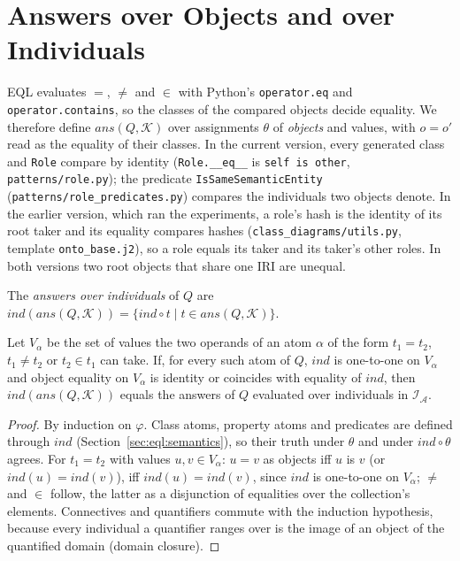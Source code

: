
\section{Answers over Objects and over Individuals}
\label{sec:objects-individuals}

EQL evaluates $=$, $\neq$ and $\in$ with Python's \texttt{operator.eq} and
\texttt{operator.contains}, so the classes of the compared objects decide equality. We therefore
define $\mathit{ans}(Q,\mathcal{K})$ over assignments $\theta$ of \emph{objects} and values, with
$o=o'$ read as the equality of their classes. In the current version, every generated class and
\texttt{Role} compare by identity (\texttt{Role.\_\_eq\_\_} is \texttt{self is other},
\texttt{patterns/role.py}); the predicate \texttt{IsSameSemanticEntity}
(\texttt{patterns/role\_predicates.py}) compares the individuals two objects denote. In the
earlier version, which ran the experiments, a role's hash is the identity of its root taker and
its equality compares hashes (\texttt{class\_diagrams/utils.py}, template \texttt{onto\_base.j2}),
so a role equals its taker and its taker's other roles. In both versions two root objects that
share one IRI are unequal.

\begin{definition}
The \emph{answers over individuals} of $Q$ are
$\mathit{ind}(\mathit{ans}(Q,\mathcal{K}))=\{\mathit{ind}\circ t \mid t\in\mathit{ans}(Q,\mathcal{K})\}$.
\end{definition}

\begin{proposition}
\label{prop:objects-individuals}
Let $V_\alpha$ be the set of values the two operands of an atom $\alpha$ of the form $t_1=t_2$,
$t_1\neq t_2$ or $t_2\in t_1$ can take. If, for every such atom of $Q$, $\mathit{ind}$ is
one-to-one on $V_\alpha$ and object equality on $V_\alpha$ is identity or coincides with equality
of $\mathit{ind}$, then $\mathit{ind}(\mathit{ans}(Q,\mathcal{K}))$ equals the answers of $Q$
evaluated over individuals in $\mathcal{I}_{\mathcal{A}}$.
\end{proposition}

\begin{proof}
By induction on $\varphi$. Class atoms, property atoms and predicates are defined through
$\mathit{ind}$ (Section~\ref{sec:eql:semantics}), so their truth under $\theta$ and under
$\mathit{ind}\circ\theta$ agrees. For $t_1=t_2$ with values $u,v\in V_\alpha$: $u=v$ as objects
iff $u$ is $v$ (or $\mathit{ind}(u)=\mathit{ind}(v)$), iff $\mathit{ind}(u)=\mathit{ind}(v)$, since
$\mathit{ind}$ is one-to-one on $V_\alpha$; $\neq$ and $\in$ follow, the latter as a disjunction
of equalities over the collection's elements. Connectives and quantifiers commute with the
induction hypothesis, because every individual a quantifier ranges over is the image of an object
of the quantified domain (domain closure).
\end{proof}


